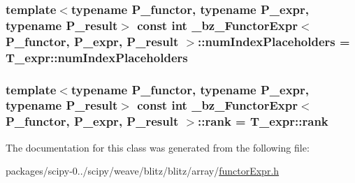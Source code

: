 \subsubsection[{num\+Index\+Placeholders}]{\setlength{\rightskip}{0pt plus 5cm}template$<$typename P\+\_\+functor, typename P\+\_\+expr, typename P\+\_\+result$>$ const int {\bf \+\_\+bz\+\_\+\+Functor\+Expr}$<$ P\+\_\+functor, P\+\_\+expr, P\+\_\+result $>$\+::num\+Index\+Placeholders = T\+\_\+expr\+::num\+Index\+Placeholders\hspace{0.3cm}{\ttfamily [static]}}\label{class__bz__FunctorExpr_a83a2df4fa96618cd48e31b8b7e1fd0a2}
\hypertarget{class__bz__FunctorExpr_a34e5b88b9c07345c11118510630102ce}{}
\subsubsection[{rank}]{\setlength{\rightskip}{0pt plus 5cm}template$<$typename P\+\_\+functor, typename P\+\_\+expr, typename P\+\_\+result$>$ const int {\bf \+\_\+bz\+\_\+\+Functor\+Expr}$<$ P\+\_\+functor, P\+\_\+expr, P\+\_\+result $>$\+::rank = T\+\_\+expr\+::rank\hspace{0.3cm}{\ttfamily [static]}}\label{class__bz__FunctorExpr_a34e5b88b9c07345c11118510630102ce}


The documentation for this class was generated from the following file\+:\begin{DoxyCompactItemize}
\item 
packages/scipy-\/0../scipy/weave/blitz/blitz/array/\hyperlink{functorExpr_8h}{functor\+Expr.\+h}\end{DoxyCompactItemize}
